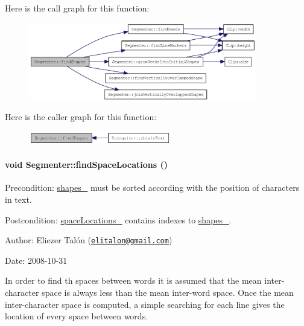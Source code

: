 Here is the call graph for this function:\nopagebreak
\begin{figure}[H]
\begin{center}
\leavevmode
\includegraphics[width=282pt]{class_segmenter_465c8e755bb56d247add080a04377520_cgraph}
\end{center}
\end{figure}


Here is the caller graph for this function:\nopagebreak
\begin{figure}[H]
\begin{center}
\leavevmode
\includegraphics[width=176pt]{class_segmenter_465c8e755bb56d247add080a04377520_icgraph}
\end{center}
\end{figure}
\hypertarget{class_segmenter_7f4ab775f61d92c4d051f6ef4685cf6f}{
\paragraph[findSpaceLocations]{\setlength{\rightskip}{0pt plus 5cm}void Segmenter::findSpaceLocations ()}\hfill}
\label{class_segmenter_7f4ab775f61d92c4d051f6ef4685cf6f}


\begin{Desc}
\item[Precondition:]\hyperlink{class_segmenter_41b94ede2829063e0937dc150756e77e}{shapes\_\-} must be sorted according with the position of characters in text.\end{Desc}
\begin{Desc}
\item[Postcondition:]\hyperlink{class_segmenter_b6a330577017efe9e49c174c04c4f7c3}{spaceLocations\_\-} contains indexes to \hyperlink{class_segmenter_41b94ede2829063e0937dc150756e77e}{shapes\_\-}.\end{Desc}
\begin{Desc}
\item[Author:]Eliezer Talón (\href{mailto:elitalon@gmail.com}{\tt elitalon@gmail.com}) \end{Desc}
\begin{Desc}
\item[Date:]2008-10-31\end{Desc}
In order to find th spaces between words it is assumed that the mean inter-character space is always less than the mean inter-word space. Once the mean inter-character space is computed, a simple searching for each line gives the location of every space between words. 

